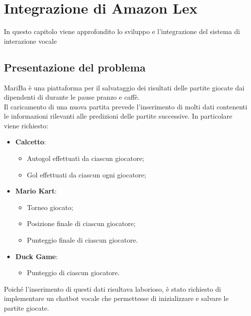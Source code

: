 
\chapter{Integrazione di Amazon Lex}
\label{cap:lex}

In questo capitolo viene approfondito lo sviluppo e l'integrazione del sistema di interazione vocale \\


\section{Presentazione del problema}
MariBa è una piattaforma per il salvataggio dei risultati delle partite giocate dai dipendenti di \azienda durante le 
pause pranzo e caffè. \\
Il caricamento di una nuova partita prevede l'inserimento di molti dati contenenti le informazioni rilevanti alle predizioni delle partite successive. 
In particolare viene richiesto: 
\begin{itemize}
	\item \textbf{Calcetto}:
	\begin{itemize}
		\item Autogol effettuati da ciascun giocatore;
		\item Gol effettuati da ciascun ogni giocatore;
	\end{itemize}
	\item \textbf{Mario Kart}:
	\begin{itemize}
		\item Torneo giocato;
		\item Posizione finale di ciascun giocatore;
		\item Punteggio finale di ciascun giocatore.
	\end{itemize}
	\item \textbf{Duck Game}:
	\begin{itemize}
		\item Punteggio di ciascun giocatore.
	\end{itemize}
\end{itemize}
Poiché l'inserimento di questi dati risultava laborioso, è stato richiesto di implementare un \gls{chatbot} vocale 
che permettesse di inizializzare e salvare le partite giocate.

